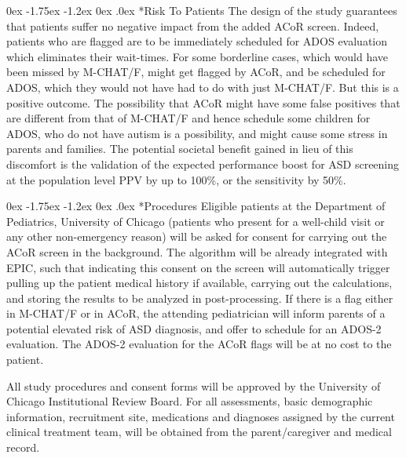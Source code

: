 \documentclass[onecolumn, compsoc,11pt]{IEEEtran}
\makeatletter
\renewcommand\subsection{\@startsection {subsection}{2}{\z@}%
                                   {0ex \@plus -1.75ex \@minus -1.2ex}%
                                   {0ex \@plus.0ex}%
                                   {\fontsize{11}{11}\selectfont\bfseries\sffamily\color{black}}}
\def\ZERO{ACoR\xspace}
\makeatother
\begin{document}
\subsection*{Risk To Patients} The design of the study guarantees that patients suffer no negative impact from the added \ZERO screen. Indeed, patients who are flagged are to be immediately scheduled for ADOS evaluation which eliminates their wait-times. For some borderline cases, which would have been missed by M-CHAT/F, might get flagged by \ZERO, and be scheduled for ADOS, which they would not have had to do with just M-CHAT/F. But this is a positive outcome. The possibility that \ZERO might have some false positives that are different from that of M-CHAT/F and hence schedule some children for ADOS, who do not have autism is a possibility, and might cause some stress in parents and families. The potential societal benefit gained in lieu of this discomfort is the validation of the expected  performance boost for ASD screening at the population level PPV by up to 100\%, or the sensitivity by 50\%.

\subsection*{Procedures} Eligible patients at the Department of Pediatrics, University of Chicago (patients who present for a well-child visit or any other non-emergency reason) will be asked  for consent for carrying out the \ZERO screen in the background. The algorithm will be already integrated with EPIC, such that indicating this consent on the screen will automatically trigger pulling up the patient medical history if available,  carrying out the calculations, and storing the results to be analyzed in post-processing. If there is a flag either in M-CHAT/F or in \ZERO, the attending pediatrician will inform parents of a potential elevated risk of ASD diagnosis, and offer to schedule for an ADOS-2 evaluation. The ADOS-2 evaluation for the \ZERO flags will be at no cost to the patient.

All study procedures and consent forms will be approved by the University of Chicago Institutional Review Board.  For all assessments, basic demographic information, recruitment site, medications and diagnoses assigned by the current clinical treatment team, will be obtained from the parent/caregiver and medical record.
\end{document}
